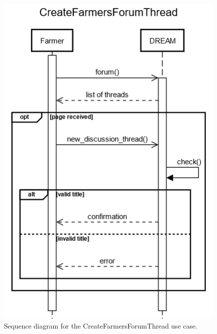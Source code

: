 \documentclass{article}
\begin{document}
\begin{figure}[H]
    \centering
	\includegraphics[scale=0.5]{sequence_diagrams/CreateFarmersForumThread.png}
    \caption{Sequence diagram for the CreateFarmersForumThread use case.}
\end{figure}
\newpage

\end{document}
